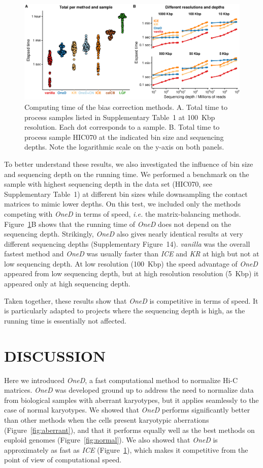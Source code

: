 \documentclass[a4,center,fleqn]{NAR}
\begin{document}
\begin{figure}
\centerline{\includegraphics[width=.49\textwidth]
  {nar_figures/figure_6.eps}}
\caption{Computing time of the bias correction methods. A. Total time to
process samples listed in Supplementary Table~1 at 100~Kbp resolution.
Each dot corresponds to a sample. B. Total time to process sample HIC070
at the indicated bin size and sequencing depths. Note the logarithmic
scale on the y-axis on both panels.}
\label{fig:times}
\end{figure}

To better understand these results, we also investigated the influence of
bin size and sequencing depth on the running time. We performed a
benchmark on the sample with highest sequencing depth in the data set
(HIC070, see Supplementary Table~1) at different bin sizes while
downsampling the contact matrices to mimic lower depths. On this
test, we included only the methods competing with \textit{OneD} in terms
of speed, \textit{i.e.} the matrix-balancing methods.
Figure~\ref{fig:times}B shows that the running time of \textit{OneD} does
not depend on the sequencing depth. Strikingly, \textit{OneD} also gives
nearly identical results at very different sequencing depths
(Supplementary Figure~14). \textit{vanilla} was the overall fastest method
and \textit{OneD} was usually faster than \textit{ICE} and \textit{KR}
at high but not at low sequencing depth. At low resolution (100~Kbp) the
speed advantage of \textit{OneD} appeared from low sequencing depth, but
at high resolution resolution (5~Kbp) it appeared only at high sequencing
depth.

Taken together, these results show that \textit{OneD} is competitive in
terms of speed. It is particularly adapted to projects where the
sequencing depth is high, as the running time is essentially not affected.



\section{DISCUSSION}

Here we introduced \textit{OneD}, a fast computational method to normalize
Hi-C matrices. \textit{OneD} was developed ground up to address the need
to normalize data from biological samples with aberrant karyotypes, but it
applies seamlessly to the case of normal karyotypes. We showed that
\textit{OneD} performs significantly better than other methods when the
cells present karyotypic aberrations (Figure~\ref{fig:aberrant}), and that
it performs equally well as the best methods on euploid genomes
(Figure~\ref{fig:normal}). We also showed that \textit{OneD} is
approximately as fast as \textit{ICE} (Figure~\ref{fig:times}), which
makes it competitive from the point of view of computational speed.
\end{document}
